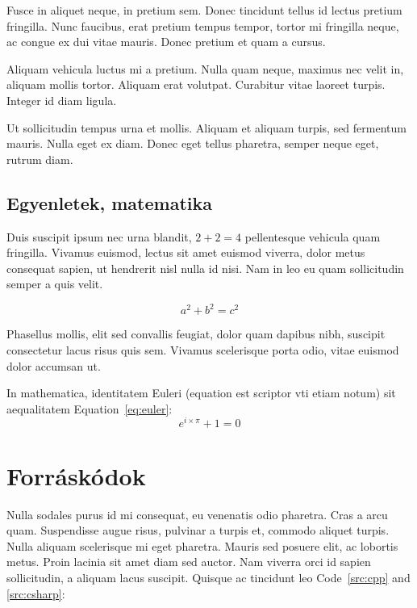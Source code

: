 Fusce in aliquet neque, in pretium sem. Donec tincidunt tellus id lectus pretium fringilla. Nunc faucibus, erat pretium tempus tempor, tortor mi fringilla neque, ac congue ex dui vitae mauris. Donec pretium et quam a cursus.

\begin{note}
Aliquam vehicula luctus mi a pretium. Nulla quam neque, maximus nec velit in, aliquam mollis tortor. Aliquam erat volutpat. Curabitur vitae laoreet turpis. Integer id diam ligula.
\end{note}

Ut sollicitudin tempus urna et mollis. Aliquam et aliquam turpis, sed fermentum mauris. Nulla eget ex diam. Donec eget tellus pharetra, semper neque eget, rutrum diam.

\subsection{Egyenletek, matematika}

Duis suscipit ipsum nec urna blandit, $2 + 2 = 4$ pellentesque vehicula quam fringilla. Vivamus euismod, lectus sit amet euismod viverra, dolor metus consequat sapien, ut hendrerit nisl nulla id nisi. Nam in leo eu quam sollicitudin semper a quis velit.

$$a^2 + b^2 = c^2$$

Phasellus mollis, elit sed convallis feugiat, dolor quam dapibus nibh, suscipit consectetur lacus risus quis sem. Vivamus scelerisque porta odio, vitae euismod dolor accumsan ut.

In mathematica, identitatem Euleri (equation est scriptor vti etiam notum) sit aequalitatem Equation~\ref{eq:euler}:
\begin{equation}\label{eq:euler}
e^{i \times \pi} + 1 = 0
\end{equation}


\section{Forráskódok}

Nulla sodales purus id mi consequat, eu venenatis odio pharetra. Cras a arcu quam. Suspendisse augue risus, pulvinar a turpis et, commodo aliquet turpis. Nulla aliquam scelerisque mi eget pharetra. Mauris sed posuere elit, ac lobortis metus. Proin lacinia sit amet diam sed auctor. Nam viverra orci id sapien sollicitudin, a aliquam lacus suscipit. Quisque ac tincidunt leo Code~\ref{src:cpp} and \ref{src:csharp}:

